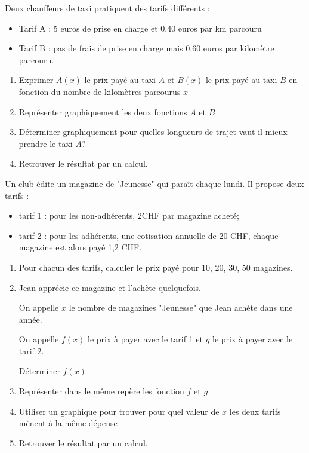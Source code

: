 \begin{exercice}
Deux chauffeurs de taxi pratiquent des tarifs différents :
\begin{itemize}
\item Tarif A : 5 euros de prise en charge et 0,40 euros par km parcouru
\item Tarif B : pas de frais de prise en charge mais 0,60 euros par kilomètre parcouru. 
\end{itemize}
\begin{enumerate}
\item Exprimer $A(x)$ le prix payé au taxi $A$ et $B(x)$ le prix payé au taxi $B$ en fonction du nombre de kilomètres parcourus $x$
\item Représenter graphiquement les deux fonctions $A$ et $B$
\item Déterminer graphiquement pour quelles longueurs de trajet vaut-il mieux prendre le taxi $A$?
\item Retrouver le résultat par un calcul.
\end{enumerate}
\end{exercice}


\begin{exercice}
Un club édite un magazine de "Jeunesse" qui paraît chaque lundi. Il propose deux tarifs :
\begin{itemize}
\item tarif 1 : pour les non-adhérents, 2CHF par magazine acheté;
\item tarif 2 : pour les adhérents, une cotisation annuelle de 20 CHF, chaque magazine est alors payé 1,2 CHF.
\end{itemize}
\begin{enumerate}
\item Pour chacun des tarifs, calculer le prix payé pour 10, 20, 30, 50 magazines.
\item Jean apprécie ce magazine et l'achète quelquefois.

On appelle $x$ le nombre de magazines "Jeunesse" que Jean achète dans une année.

On appelle $f(x)$ le prix à payer avec le tarif 1 et $g$ le prix à payer avec le tarif 2.

Déterminer $f(x)$
\item Représenter dans le même repère les fonction $f$ et $g$
\item Utiliser un graphique pour trouver pour quel valeur de $x$ les deux tarifs mènent à la même dépense
\item Retrouver le résultat par un calcul.
\end{enumerate}
\end{exercice}

